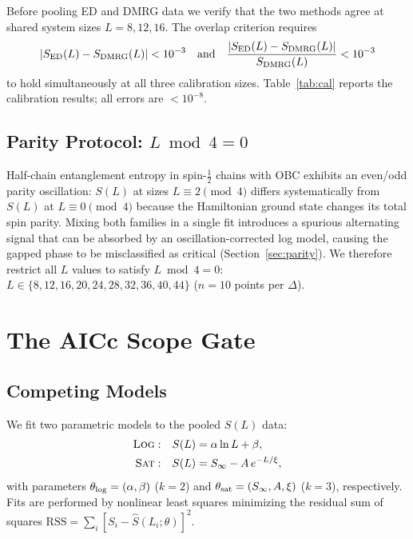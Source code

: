 \documentclass[11pt,letterpaper]{article}
\newcommand{\Sinf}{S_{\infty}}
\newcommand{\half}{\tfrac{1}{2}}
\newcommand{\modeltag}[1]{\textsc{#1}}
\begin{document}
Before pooling ED and DMRG data we verify that the two methods agree at
shared system sizes $L = 8, 12, 16$.  The overlap criterion requires
\begin{equation}
  |S_{\rm ED}(L) - S_{\rm DMRG}(L)| < 10^{-3}
  \quad\text{and}\quad
  \frac{|S_{\rm ED}(L) - S_{\rm DMRG}(L)|}{S_{\rm DMRG}(L)} < 10^{-3}
  \label{eq:overlap}
\end{equation}
to hold simultaneously at all three calibration sizes.  Table~\ref{tab:cal}
reports the calibration results; all errors are $< 10^{-8}$.

\subsection{Parity Protocol: $L \bmod 4 = 0$}

Half-chain entanglement entropy in spin-$\half$ chains with OBC exhibits
an even/odd parity oscillation: $S(L)$ at sizes $L \equiv 2 \pmod{4}$
differs systematically from $S(L)$ at $L \equiv 0 \pmod{4}$ because the
Hamiltonian ground state changes its total spin parity.  Mixing both
families in a single fit introduces a spurious alternating signal that can
be absorbed by an oscillation-corrected log model, causing the gapped phase
to be misclassified as critical (Section~\ref{sec:parity}).  We therefore
restrict all $L$ values to satisfy $L \bmod 4 = 0$:
$L \in \{8, 12, 16, 20, 24, 28, 32, 36, 40, 44\}$ ($n = 10$ points per
$\Delta$).

\section{The AICc Scope Gate}
\label{sec:gate}

\subsection{Competing Models}

We fit two parametric models to the pooled $S(L)$ data:
\begin{align}
  \text{\modeltag{Log}}: & \quad S(L) = \alpha \ln L + \beta,
    \label{eq:log} \\
  \text{\modeltag{Sat}}: & \quad S(L) = \Sinf - A\,e^{-L/\xi},
    \label{eq:sat}
\end{align}
with parameters $\theta_{\rm log} = (\alpha, \beta)$ ($k=2$) and
$\theta_{\rm sat} = (\Sinf, A, \xi)$ ($k=3$), respectively.  Fits are
performed by nonlinear least squares minimizing the residual sum of squares
$\mathrm{RSS} = \sum_i [S_i - \hat{S}(L_i;\theta)]^2$.
\end{document}

